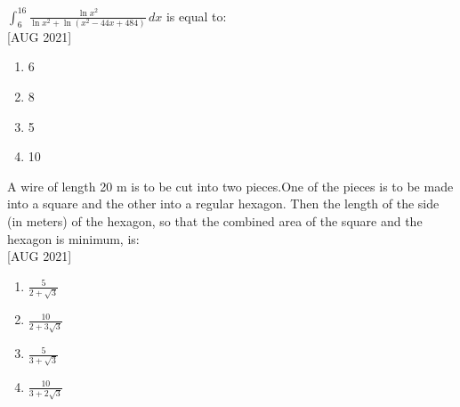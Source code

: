     \item $\int_{6}^{16} \frac{\ln x^2}{\ln{x^2} + \ln{(x^2 - 44x + 484)}} \, dx$ is equal to: \\\hfill{[AUG 2021]}
    \begin{multicols}{4}
    \begin{enumerate}
        \item 6
        \item 8
        \item 5
        \item 10
    \end{enumerate} 
    \end{multicols}
    \item A wire of length 20 m is to be cut into two pieces.One of the pieces is to be made into a square and the other into a regular hexagon. Then the length of the side (in meters) of the hexagon, so that the combined area of the square and the hexagon is minimum, is:  \\\hfill{[AUG 2021]}
    \begin{multicols}{4}
    \begin{enumerate}
        \item $\frac{5}{2 + \sqrt{3}}$
        \item $\frac{10}{2 + 3\sqrt{3}}$
        \item $\frac{5}{3 + \sqrt{3}}$
        \item $\frac{10}{3 + 2\sqrt{3}}$
    \end{enumerate} 
    \end{multicols}
